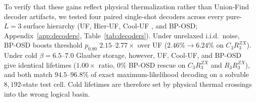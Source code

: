 \documentclass[aps,prx,reprint,superscriptaddress,nofootinbib,floatfix]{revtex4-2}
\begin{document}
To verify that these gains reflect physical thermalization rather than Union-Find decoder artifacts, we tested four paired single-shot decoders across every pure-$L = 3$ surface hierarchy (UF, Hier-UF, Cool-UF \cite{kubica_sweep2019}, and BP-OSD; Appendix~\ref{app:decoders}, Table~\ref{tab:decoders}). Under unrelaxed i.i.d.\ noise, BP-OSD boosts threshold $p_{0.80}$ $2.15\text{--}2.77\times$ over UF ($2.46\% \to 6.24\%$ on $C_3 R_3^{ZX}$). Under cold $\beta = 6.5\text{--}7.0$ Glauber storage, however, UF, Cool-UF, and BP-OSD give identical lifetimes ($1.00\times$ ratio, $0\%$ BP-OSD rescue on $C_3 R_3^{ZX}$ and $R_3 R_3^{ZX}$), and both match $94.5\text{--}96.8\%$ of exact maximum-likelihood decoding on a solvable $8{,}192$-state test cell. Cold lifetimes are therefore set by physical thermal crossings into the wrong logical basin.
\end{document}
